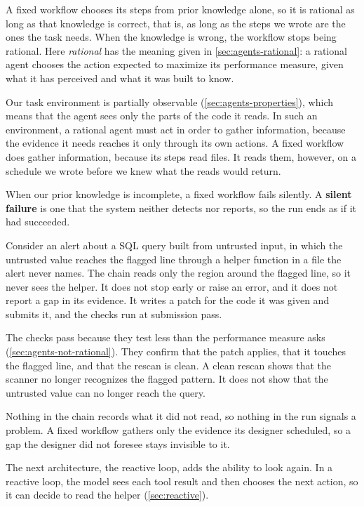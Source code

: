 A fixed workflow chooses its steps from prior knowledge alone, so it is rational as long as that
knowledge is correct, that is, as long as the steps we wrote are the ones the task needs. When the
knowledge is wrong, the workflow stops being rational. Here \emph{rational} has the meaning given
in \cref{sec:agents-rational}: a rational agent chooses the action expected to maximize its
performance measure, given what it has perceived and what it was built to know.

Our task environment is partially observable (\cref{sec:agents-properties}), which means that the agent sees
only the parts of the code it reads. In such an environment, a rational agent must act in order to
gather information, because the evidence it needs reaches it only through its own actions. A fixed
workflow does gather information, because its steps read files. It reads them, however, on a
schedule we wrote before we knew what the reads would return.

When our prior knowledge is incomplete, a fixed workflow fails silently. A \textbf{silent failure}
is one that the system neither detects nor reports, so the run ends as if it had succeeded.

Consider an alert about a SQL query built from untrusted input, in which the untrusted value
reaches the flagged line through a helper function in a file the alert never names. The chain reads
only the region around the flagged line, so it never sees the helper. It does not stop early or
raise an error, and it does not report a gap in its evidence. It writes a patch for the code it was
given and submits it, and the checks run at submission pass.

The checks pass because they test less than the performance measure asks
(\cref{sec:agents-not-rational}). They confirm that the patch applies, that it touches the flagged
line, and that the rescan is clean. A clean rescan shows that the scanner no longer recognizes the
flagged pattern. It does not show that the untrusted value can no longer reach the query.

Nothing in the chain records what it did not read, so nothing in the run signals a problem. A fixed
workflow gathers only the evidence its designer scheduled, so a gap the designer did not foresee
stays invisible to it.

The next architecture, the reactive loop, adds the ability to look again. In a reactive loop, the
model sees each tool result and then chooses the next action, so it can decide to read the helper
(\cref{sec:reactive}).

